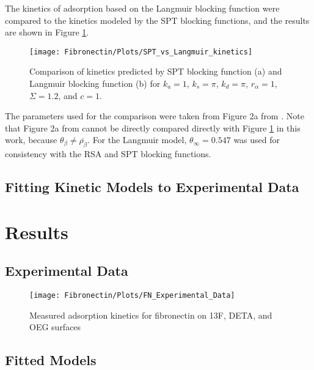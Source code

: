 The kinetics of adsorption based on the Langmuir blocking function
were compared to the kinetics modeled by the SPT blocking functions,
and the results are shown in Figure \ref{fig:SPT vs Langmuir kinetics}.
%
\begin{figure}[h]
\texttt{[image: Fibronectin/Plots/SPT\_vs\_Langmuir\_kinetics]}

\caption{\label{fig:SPT vs Langmuir kinetics}Comparison of kinetics predicted
by SPT blocking function (a) and Langmuir blocking function (b) for
$k_{a}=1$, $k_{s}=\pi$, $k_{d}=\pi$, $r_{\alpha}=1$, $\Sigma=1.2$,
and $c=1$.}

\end{figure}
 The parameters used for the comparison were taken from Figure 2a
from \cite{Brusatori1999}. Note that Figure 2a from \cite{Brusatori1999}
cannot be directly compared directly with Figure \ref{fig:SPT vs Langmuir kinetics}
in this work, because $\theta_{\beta}\neq\overline{\rho_{\beta}}$.
For the Langmuir model, $\theta_{\infty}=0.547$ was used for consistency
with the RSA and SPT blocking functions.


\subsection{Fitting Kinetic Models to Experimental Data}


\section{Results}


\subsection{Experimental Data}

%
\begin{figure}
\texttt{[image: Fibronectin/Plots/FN\_Experimental\_Data]}

\caption{\label{fig:FN experiments}Measured adsorption kinetics for fibronectin
on 13F, DETA, and OEG surfaces}



\end{figure}



\subsection{Fitted Models}

